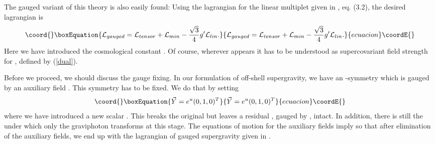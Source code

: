 \documentclass[a4paper,12pt, twoside]{article}
\numberwithin{equation}{section}
\begin{document}
The gauged variant of this theory is also easily found: Using the 
lagrangian \coordHE{} for the linear multiplet given in 
\cite{Zucker:1999fn}, eq. (3.2), the desired lagrangian is 
\begin{equation}\coord{}\boxEquation{
{\cal L}_{gauged}={\cal L}_{tensor}+{\cal L}_{min}-\frac{\sqrt{3}}{4} 
g'{\cal L}_{lin}.\label{orbi1}
}{
{\cal L}_{gauged}={\cal L}_{tensor}+{\cal L}_{min}-\frac{\sqrt{3}}{4} 
g'{\cal L}_{lin}.}{ecuacion}\coordE{}\end{equation}
Here we have introduced the cosmological constant \coordHE{}. Of course, 
wherever \coordHE{} appears it has to be understood as supercovariant field 
strength for \coordHE{}, defined by (\ref{dual}).

Before we proceed, we should discuss the gauge fixing. In our 
formulation of off-shell supergravity, we have an \coordHE{}  \coordHE{}-symmetry which is gauged by an auxiliary field \coordHE{}. This symmetry 
has to be fixed. We do that by setting \cite{deWit:1983na}
\begin{equation}\coord{}\boxEquation{
\vec{Y}=e^u(0,1,0)^T\label{eichfixx}
}{
\vec{Y}=e^u(0,1,0)^T}{ecuacion}\coordE{}\end{equation}
where we have introduced a new scalar \coordHE{}. This breaks the original 
\coordHE{} but leaves a residual \coordHE{}, gauged by \coordHE{}, intact. 
In addition, there is still the \coordHE{} under which only the graviphoton 
\coordHE{} transforms at this stage. The equations of motion for the 
auxiliary fields imply \coordHE{} so that after elimination of the 
auxiliary fields, we end up with the lagrangian of gauged supergravity given 
in \cite{Zucker:1999fn}. 
\end{document}
